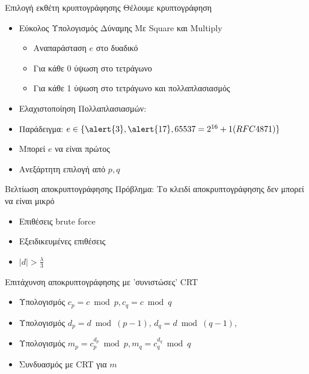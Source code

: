 \documentclass[handout]{beamer}
\begin{document}
\begin{frame}{Επιλογή εκθέτη κρυπτογράφησης}
Θέλουμε  κρυπτογράφηση
\begin{itemize}
	\item Εύκολος Υπολογισμός Δύναμης Με Square και Multiply
	\pause
	\begin{itemize}
		\item Αναπαράσταση $e$ στο δυαδικό
		\item Για κάθε 0 ύψωση στο τετράγωνο
		\item Για κάθε 1 ύψωση στο τετράγωνο και πολλαπλασιασμός
	\end{itemize}
	\pause
	\item Ελαχιστοποίηση Πολλαπλασιασμών: 	
	\item Παράδειγμα: $e \in \{ \alert{3},\alert{17},65537=2^{16}+1(RFC4871)\}$
	\item Μπορεί $e$ να είναι πρώτος
	\item Ανεξάρτητη επιλογή από $p,q$
\end{itemize}
\end{frame}

\begin{frame}{Βελτίωση αποκρυπτογράφησης}
\alert{Πρόβλημα: Το κλειδί αποκρυπτογράφησης δεν μπορεί να είναι μικρό}
\begin{itemize}
\item Επιθέσεις brute force
\item Εξειδικευμένες επιθέσεις
\item $|d| > \frac{\lambda}{3}$
\end{itemize}
\pause
\begin{block}{Επιτάχυνση αποκρυπτογράφησης με 'συνιστώσες' CRT}
\begin{itemize}
\item Υπολογισμός $c_p = c \bmod p, c_q = c \bmod q$ \pause
\item Υπολογισμός $d_p = d \bmod ({p-1}), \, d_q = d \bmod ({q-1}), $  \pause 
\item Υπολογισμός $m_p = c_p^{d_p} \bmod {p}, m_q = c_q^{d_q} \bmod {q} $ \pause 
\item Συνδυασμός με CRT για $m$ 
\end{itemize}
\end{block}
\end{frame}
\end{document}
